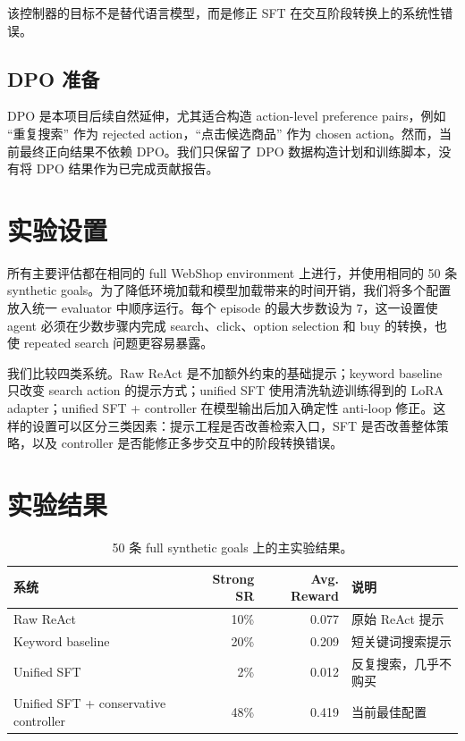 \documentclass[11pt]{article}
\begin{document}
该控制器的目标不是替代语言模型，而是修正 SFT 在交互阶段转换上的系统性错误。

\subsection{DPO 准备}

DPO 是本项目后续自然延伸，尤其适合构造 action-level preference pairs，例如 ``重复搜索'' 作为 rejected action，``点击候选商品'' 作为 chosen action。然而，当前最终正向结果不依赖 DPO。我们只保留了 DPO 数据构造计划和训练脚本，没有将 DPO 结果作为已完成贡献报告。

\section{实验设置}

所有主要评估都在相同的 full WebShop environment 上进行，并使用相同的 50 条 synthetic goals。为了降低环境加载和模型加载带来的时间开销，我们将多个配置放入统一 evaluator 中顺序运行。每个 episode 的最大步数设为 7，这一设置使 agent 必须在少数步骤内完成 search、click、option selection 和 buy 的转换，也使 repeated search 问题更容易暴露。

我们比较四类系统。Raw ReAct 是不加额外约束的基础提示；keyword baseline 只改变 search action 的提示方式；unified SFT 使用清洗轨迹训练得到的 LoRA adapter；unified SFT + controller 在模型输出后加入确定性 anti-loop 修正。这样的设置可以区分三类因素：提示工程是否改善检索入口，SFT 是否改善整体策略，以及 controller 是否能修正多步交互中的阶段转换错误。

\section{实验结果}

\begin{table}[t]
\centering
\small
\begin{tabularx}{0.96\textwidth}{lrrX}
\toprule
系统 & Strong SR & Avg. Reward & 说明 \\
\midrule
Raw ReAct & 10\% & 0.077 & 原始 ReAct 提示 \\
Keyword baseline & 20\% & 0.209 & 短关键词搜索提示 \\
Unified SFT & 2\% & 0.012 & 反复搜索，几乎不购买 \\
Unified SFT + conservative controller & 48\% & 0.419 & 当前最佳配置 \\
\bottomrule
\end{tabularx}
\caption{50 条 full synthetic goals 上的主实验结果。}
\label{tab:main}
\end{table}
\end{document}
